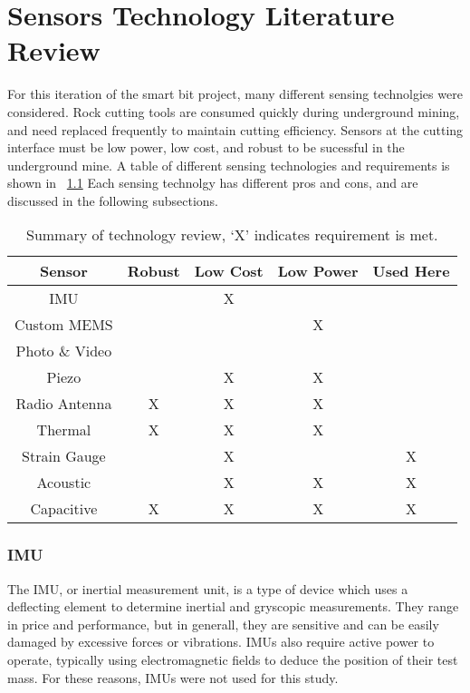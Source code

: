 \chapter{Sensors Technology Literature Review\label{chap:3}}

For this iteration of the smart bit project, many different sensing technolgies were considered.
Rock cutting tools are consumed quickly during underground mining, and need replaced frequently
to maintain cutting efficiency. 
Sensors at the cutting interface must be low power, low cost, and robust 
to be sucessful in the underground mine.
A table of different sensing technologies and requirements is shown in ~\ref{tab:sense_review}
Each sensing technolgy has different pros and cons, and are discussed in the following subsections.


\begin{table}[]
\centering
\caption{Summary of technology review, `X' indicates requirement is met.}
\label{tab:sense_review}
\begin{tabular}{|c|c|c|c|c|}
\hline
Sensor         & Robust & Low Cost & Low Power & Used Here \\ \hline
IMU            &        & X        &           &           \\ \hline
Custom MEMS    &        &          & X         &           \\ \hline
Photo \& Video &        &          &           &           \\ \hline
Piezo          &        & X        & X         &           \\ \hline
Radio Antenna  & X      & X        & X         &           \\ \hline
Thermal        & X      & X        & X         &           \\ \hline
Strain Gauge   &        & X        &           & X         \\ \hline
Acoustic       &        & X        & X         & X         \\ \hline
Capacitive     & X      & X        & X         & X         \\ \hline
\end{tabular}
\end{table}

\subsection{IMU}
The IMU, or inertial measurement unit, is a type of device which uses a deflecting element
to determine inertial and gryscopic measurements. They range in price and performance, but
in generall, they are sensitive and can be easily damaged by excessive forces or vibrations.
IMUs also require active power to operate, typically using electromagnetic fields to deduce the 
position of their test mass. For these reasons, IMUs were not used for this study.

